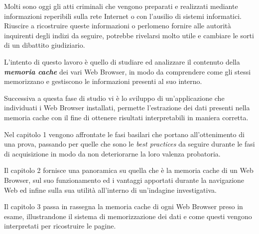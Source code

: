 Molti sono oggi gli atti criminali che vengono preparati e realizzati mediante informazioni reperibili sulla rete Internet o con l'ausilio di sistemi informatici. Riuscire a ricostruire queste informazioni o perlomeno fornire alle autorità inquirenti degli indizi da seguire, potrebbe rivelarsi molto utile e cambiare le sorti di un dibattito giudiziario.

L'intento di questo lavoro è quello di studiare ed analizzare il contenuto della \textbf{\textit{memoria cache}} dei vari Web Browser, in modo da comprendere come gli stessi memorizzano e gestiscono le informazioni presenti al suo interno. 

Successiva a questa fase di studio vi è lo sviluppo di un'applicazione che individuati i Web Browser installati, permette l'estrazione dei dati presenti nella memoria cache con il fine di ottenere risultati interpretabili in maniera corretta.

Nel capitolo 1 vengono affrontate le fasi basilari che portano all'ottenimento di una prova, passando per quelle che sono le \textit{best practices} da seguire durante le fasi di acquisizione in modo da non deteriorarne la loro valenza probatoria. 

Il capitolo 2 fornisce una panoramica su quella che è la memoria cache di un Web Browser, sul suo funzionamento ed i vantaggi apportati durante la navigazione Web ed infine sulla sua utilità all'interno di un'indagine investigativa. 

Il capitolo 3 passa in rassegna la memoria cache di ogni Web Browser preso in esame, illustrandone il sistema di memorizzazione dei dati e come questi vengono interpretati per ricostruire le pagine.